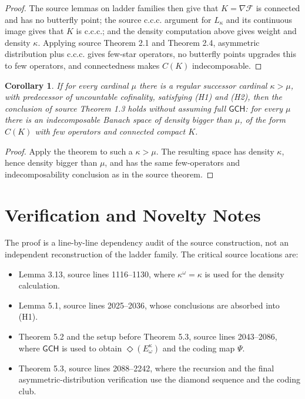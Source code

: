\documentclass[11pt]{article}
\newtheorem{corollary}{Corollary}
\newcommand{\ccc}{\mathrm{c.c.c.}}
\newcommand{\F}{\mathcal{F}}
\newcommand{\GCH}{\mathsf{GCH}}
\newcommand{\DiamondE}{\Diamond(E^\kappa_\omega)}
\begin{document}
\begin{proof}
The source lemmas on ladder families then give that \(K=\nabla\F\) is
connected and has no butterfly point; the source c.c.c. argument for
\(L_\kappa\) and its continuous image gives that \(K\) is \(\ccc\); and the
density computation above gives weight and density \(\kappa\).  Applying
source Theorem 2.1 and Theorem 2.4, asymmetric distribution plus \(\ccc\)
gives few-star operators, no butterfly points upgrades this to few operators,
and connectedness makes \(C(K)\) indecomposable.
\end{proof}

\begin{corollary}
If for every cardinal \(\mu\) there is a regular successor cardinal
\(\kappa>\mu\), with predecessor of uncountable cofinality, satisfying (H1)
and (H2), then the conclusion of source Theorem 1.3 holds without assuming
full \(\GCH\): for every \(\mu\) there is an indecomposable Banach space of
density bigger than \(\mu\), of the form \(C(K)\) with few operators and
connected compact \(K\).
\end{corollary}

\begin{proof}
Apply the theorem to such a \(\kappa>\mu\).  The resulting space has density
\(\kappa\), hence density bigger than \(\mu\), and has the same few-operators
and indecomposability conclusion as in the source theorem.
\end{proof}

\section*{Verification and Novelty Notes}

The proof is a line-by-line dependency audit of the source construction, not
an independent reconstruction of the ladder family.  The critical source
locations are:
\begin{itemize}[leftmargin=2em]
\item Lemma 3.13, source lines 1116--1130, where
\(\kappa^\omega=\kappa\) is used for the density calculation.
\item Lemma 5.1, source lines 2025--2036, whose conclusions are absorbed into
(H1).
\item Theorem 5.2 and the setup before Theorem 5.3, source lines 2043--2086,
where \(\GCH\) is used to obtain \(\DiamondE\) and the coding map \(\Psi\).
\item Theorem 5.3, source lines 2088--2242, where the recursion and the final
asymmetric-distribution verification use the diamond sequence and the coding
club.
\end{itemize}
\end{document}
